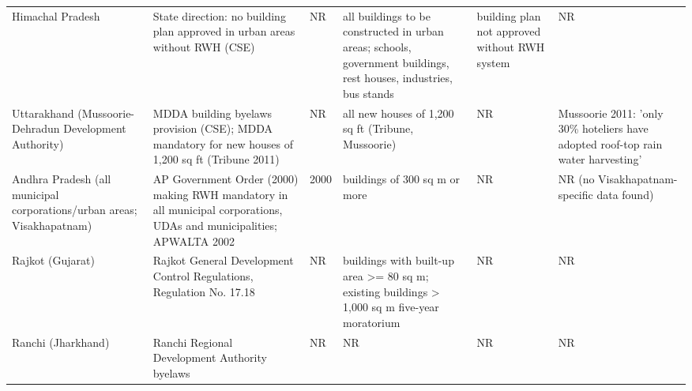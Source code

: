 {\begin{longtable}{p{2.1cm} p{3cm} p{1.3cm} p{3cm} p{2.9cm} p{3.4cm}}
Himachal Pradesh & State direction: no building plan approved in urban areas without RWH (CSE) & NR & all buildings to be constructed in urban areas; schools, government buildings, rest houses, industries, bus stands & building plan not approved without RWH system & NR\\
Uttarakhand (Mussoorie-Dehradun Development Authority) & MDDA building byelaws provision (CSE); MDDA mandatory for new houses of 1,200 sq ft (Tribune 2011) & NR & all new houses of 1,200 sq ft (Tribune, Mussoorie) & NR & Mussoorie 2011: 'only 30\% hoteliers have adopted roof-top rain water harvesting'\\
Andhra Pradesh (all municipal corporations/urban areas; Visakhapatnam) & AP Government Order (2000) making RWH mandatory in all municipal corporations, UDAs and municipalities; APWALTA 2002 & 2000 & buildings of 300 sq m or more & NR & NR (no Visakhapatnam-specific data found)\\
Rajkot (Gujarat) & Rajkot General Development Control Regulations, Regulation No. 17.18 & NR & buildings with built-up area >= 80 sq m; existing buildings > 1,000 sq m five-year moratorium & NR & NR\\
Ranchi (Jharkhand) & Ranchi Regional Development Authority byelaws & NR & NR & NR & NR\\
\end{longtable}}
